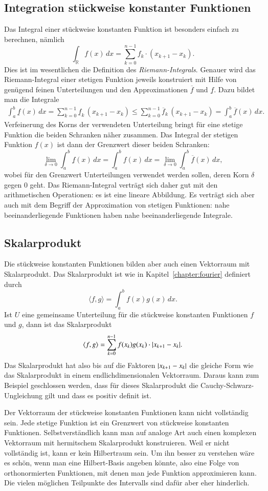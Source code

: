 \subsection{Integration stückweise konstanter Funktionen}
Das Integral einer stückweise konstanten Funktion ist besonders einfach 
zu berechnen, nämlich
\[
\int_{\mathbb R} f(x)\,dx = \sum_{k=0}^{n-1} f_k\cdot (x_{k+1}-x_k).
\]
Dies ist im wesentlichen die Definition des {\em Riemann-Integrals}.
%
Genauer wird das Riemann-Integral einer stetigen Funktion jeweils
konstruiert mit Hilfe von genügend feinen Unterteilungen und den
Approximationen $\overline{f}$ und $\underline{f}$.
Dazu bildet man die Integrale
\begin{align*}
\int_a^b \underline{f}(x)\,dx
=
\sum_{k=0}^{n-1} \underline{f}_{k}\,(x_{k+1}-x_k)
\le
\sum_{k=0}^{n-1} \overline{f}_{k}\,(x_{k+1}-x_k)
=
\int_a^b \overline{f}(x)\,dx.
\end{align*}
Verfeinerung des Korns der verwendeten Unterteilung bringt für eine
stetige Funktion die beiden Schranken näher zusammen.
Das Integral der stetigen Funktion $f(x)$ ist dann der Grenzwert
dieser beiden Schranken:
\[
\lim_{\delta\to 0}
\int_a^b \underline{f}(x)\,dx
=
\int_a^b f(x)\,dx
=
\lim_{\delta\to 0}
\int_a^b \overline{f}(x)\,dx,
\]
wobei für den Grenzwert Unterteilungen verwendet werden sollen, deren
Korn $\delta$ gegen $0$ geht.
Das Riemann-Integral verträgt sich daher gut mit den arithmetischen
Operationen: es ist eine lineare Abbildung.
Es verträgt sich aber auch mit dem Begriff der Approximation von
stetigen Funktionen: nahe beeinanderliegende Funktionen haben nahe
beeinanderliegende Integrale.

\subsection{Skalarprodukt}
Die stückweise konstanten Funktionen bilden aber auch einen Vektorraum
mit Skalarprodukt.
Das Skalarprodukt ist wie in Kapitel~\ref{chapter:fourier} definiert durch
\[
\langle f,g\rangle
=
\int_a^b
f(x) g(x)\,dx.
\]
Ist $U$ eine gemeinsame Unterteilung für die stückweise konstanten
Funktionen $f$ und $g$, dann ist das Skalarprodukt
\[
\langle f,g\rangle
=
\sum_{k=0}^{n-1} f(x_k) g(x_k) \cdot |x_{k+1}-x_{k\mathstrut}|.
\]
Das Skalarprodukt hat also bis auf die Faktoren $|x_{k+1}-x_{k\mathstrut}|$
die gleiche Form wie das Skalarprodukt in einem endlichdimensionalen
Vektorraum.
Daraus kann zum Beispiel geschlossen werden, dass für dieses Skalarprodukt
die Cauchy-Schwarz-Ungleichung gilt und dass es positiv definit ist.

Der Vektorraum der stückweise konstanten Funktionen kann nicht vollständig
sein.
Jede stetige Funktion ist ein Grenzwert von stückweise konstanten
Funktionen.
Selbstverständlich kann man auf analoge Art auch einen komplexen
Vektorraum mit hermitschem Skalarprodukt konstruieren.
Weil er nicht vollständig ist, kann er kein Hilbertraum sein.
Um ihn besser zu verstehen wäre es schön, wenn man eine Hilbert-Basis
angeben könnte, also eine Folge von orthonormierten Funktionen, mit
denen man jede Funktion approximieren kann.
Die vielen möglichen Teilpunkte des Intervalls sind dafür aber eher 
hinderlich.

